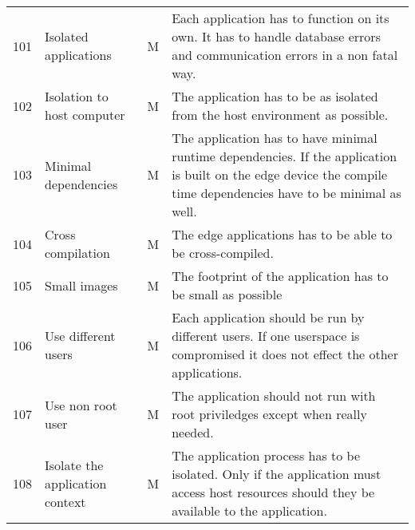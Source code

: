 \begin{longtable}{l p{3.5cm} p{0.8cm} p{12.5cm} }
101                     & Isolated applications                   & M      & Each application has to function on its own. It has to handle database errors and communication errors in a non fatal way.                                                                                                          \\
102                     & Isolation to host computer              & M      & The application has to be as isolated from the host environment as possible.                                                                                                                                                        \\
103                     & Minimal dependencies                    & M      & The application has to have minimal runtime dependencies. If the application is built on the edge device the compile time dependencies have to be minimal as well.                                                                  \\
104                     & Cross compilation                       & M      & The edge applications has to be able to be cross-compiled.                                                                                                                                                                          \\
105                     & Small images                            & M      & The footprint of the application has to be small as possible                                                                                                                                                                        \\
106                     & Use different users                     & M      & Each application should be run by different users. If one userspace is compromised it does not effect the other applications.                                                                                                       \\
107                     & Use non root user                       & M      & The application should not run with root priviledges except when really needed.                                                                                                                                                     \\
108                     & Isolate the application context         & M      & The application process has to be isolated. Only if the application must access host resources should they be available to the application.                                                                                         \\

\end{longtable}
